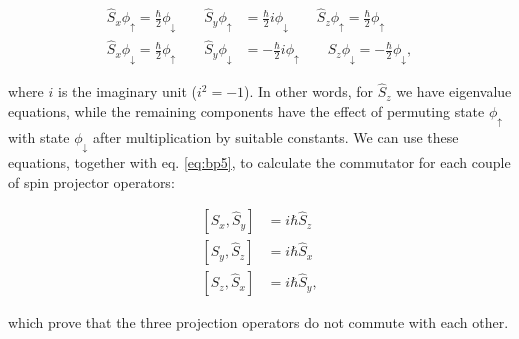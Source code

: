 \documentclass[
  9pt,
]{extbook}
\theoremstyle{definition}
\theoremstyle{definition}
\theoremstyle{definition}
\theoremstyle{remark}
\begin{document}
\begin{equation}
\begin{aligned}
\hat{S}_x \phi_{\uparrow} =  \frac{\hbar}{2} \phi_{\downarrow} \qquad \hat{S}_y \phi_{\uparrow} &=  \frac{\hbar}{2} i \phi_{\downarrow} \qquad \hat{S}_z \phi_{\uparrow} =  \frac{\hbar}{2} \phi_{\uparrow} \\
\hat{S}_x \phi_{\downarrow} =  \frac{\hbar}{2} \phi_{\uparrow} \qquad \hat{S}_y \phi_{\downarrow} &=  - \frac{\hbar}{2} i \phi_{\uparrow} \qquad \hat{S}_z \phi_{\downarrow} =  -\frac{\hbar}{2} \phi_{\downarrow},
\end{aligned}
\label{eq:spop2}  
\end{equation}

where \(i\) is the imaginary unit (\(i^2=-1\)). In other words, for \(\hat{S}_z\) we have eigenvalue equations, while the remaining components have the effect of permuting state \(\phi_{\uparrow}\) with state \(\phi_{\downarrow}\) after multiplication by suitable constants. We can use these equations, together with eq. \eqref{eq:bp5}, to calculate the commutator for each couple of spin projector operators:

\begin{equation}
\begin{aligned}
\left[\hat{S}_x, \hat{S}_y\right] &= i\hbar\hat{S}_z \\
\left[\hat{S}_y, \hat{S}_z\right] &= i\hbar\hat{S}_x \\
\left[\hat{S}_z, \hat{S}_x\right] &= i\hbar\hat{S}_y,
\end{aligned}
\label{eq:spop3}  
\end{equation}

which prove that the three projection operators do not commute with each other.
\end{document}
